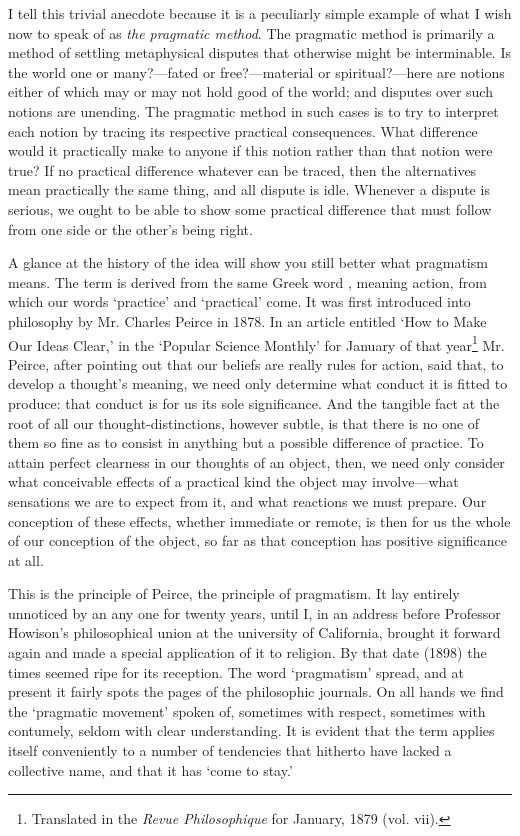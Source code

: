I tell this trivial anecdote because it is a peculiarly simple example
of what I wish now to speak of as \textit{the pragmatic method}. The
pragmatic method is primarily a method of settling metaphysical
disputes that otherwise might be interminable. Is the world one or
many?---fated or free?---material or spiritual?---here are notions
either of which may or may not hold good of the world; and disputes
over such notions are unending. The pragmatic method in such cases is
to try to interpret each notion by tracing its respective practical
consequences. What difference would it practically make to anyone if
this notion rather than that notion were true? If no practical
difference whatever can be traced, then the alternatives mean
practically the same thing, and all dispute is idle. Whenever a
dispute is serious, we ought to be  able to show some
practical difference that must follow from one side or the other's
being right.

A glance at the history of the idea will show you still better what
pragmatism means. The term is derived from the same Greek word
, meaning action, from which our words `practice' and
`practical' come. It was first introduced into philosophy by Mr.
Charles Peirce in 1878. In an article entitled `How to Make Our Ideas
Clear,' in the `Popular Science Monthly' for January of that
year\footnote{Translated in the \textit{Revue Philosophique} for
January, 1879 (vol. vii).} Mr. Peirce, after pointing out that our
beliefs are really rules for action, said that, to develop a thought's
meaning, we need only determine what conduct it is fitted to produce:
that conduct is for us its sole significance. And the tangible fact at
the root of all our thought-distinctions, however subtle, is that
there is no one of them so fine as to consist in anything but a
possible difference of practice. To attain perfect clearness in our
thoughts of an object, then, we need only consider what conceivable
 effects of a practical kind the object may in\-volve---what
sensations we are to expect from it, and what reactions we must
prepare. Our conception of these effects, whether immediate or remote,
is then for us the whole of our conception of the object, so far as
that conception has positive significance at all.

This is the principle of Peirce, the principle of pragmatism. It lay
entirely unnoticed by an any one for twenty years, until I, in an
address before Professor Howison's philosophical union at the
university of California, brought it forward again and made a special
application of it to religion. By that date (1898) the times seemed
ripe for its reception. The word `pragmatism' spread, and at present
it fairly spots the pages of the philosophic journals. On all hands we
find the `pragmatic movement' spoken of, sometimes with respect,
sometimes with contumely, seldom with clear understanding. It is
evident that the term applies itself conveniently to a number of
tendencies that hitherto have lacked a collective name, and that it
has `come to stay.'

